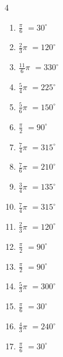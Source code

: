 \begin{multicols}{4}
\begin{enumerate}
  \item $\displaystyle \frac{\pi}{6}$
        $\displaystyle =30^{\circ}$

  \item $\displaystyle \frac{2}{3}\pi$
        $\displaystyle =120^{\circ}$

  \item $\displaystyle \frac{11}{6}\pi$
        $\displaystyle =330^{\circ}$

  \item $\displaystyle \frac{5}{4}\pi$
        $\displaystyle =225^{\circ}$

  \item $\displaystyle \frac{5}{6}\pi$
        $\displaystyle =150^{\circ}$

  \item $\displaystyle \frac{\pi}{2}$
        $\displaystyle =90^{\circ}$

  \item $\displaystyle \frac{7}{4}\pi$
        $\displaystyle =315^{\circ}$

  \item $\displaystyle \frac{7}{6}\pi$
        $\displaystyle =210^{\circ}$

  \item $\displaystyle \frac{3}{4}\pi$
        $\displaystyle =135^{\circ}$

  \item $\displaystyle \frac{7}{4}\pi$
        $\displaystyle =315^{\circ}$

  \item $\displaystyle \frac{2}{3}\pi$
        $\displaystyle =120^{\circ}$

  \item $\displaystyle \frac{\pi}{2}$
        $\displaystyle =90^{\circ}$

  \item $\displaystyle \frac{\pi}{2}$
        $\displaystyle =90^{\circ}$

  \item $\displaystyle \frac{5}{3}\pi$
        $\displaystyle =300^{\circ}$

  \item $\displaystyle \frac{\pi}{6}$
        $\displaystyle =30^{\circ}$

\columnbreak %

  \item $\displaystyle \frac{4}{3}\pi$
        $\displaystyle =240^{\circ}$

  \item $\displaystyle \frac{\pi}{6}$
        $\displaystyle =30^{\circ}$


\end{enumerate}
\end{multicols}
